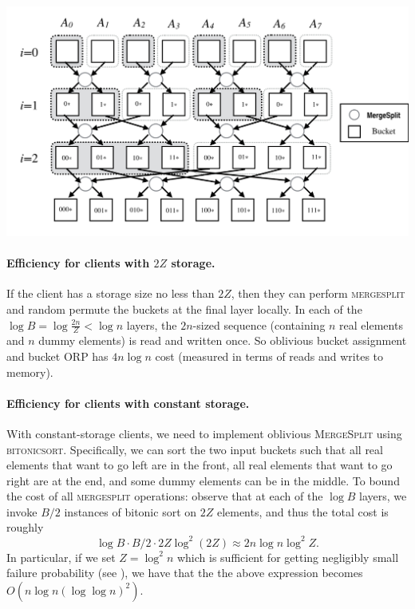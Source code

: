 \includegraphics[scale=0.45]{fig2.png}

\paragraph{Efficiency for clients with $2Z$ storage.}

If the client has a storage size no less than $2Z$, then they can perform \textsc{mergesplit} and random permute the buckets at the final layer locally. In each of the $\log B = \log \frac{2n}{Z} < \log n$ layers, the $2n$-sized sequence (containing $n$ real elements and $n$ dummy elements) is read  and written once. So oblivious bucket assignment and bucket ORP has $4n\log n$ cost (measured
in terms of reads and writes to memory). 

\paragraph{Efficiency for clients with constant storage.}
With constant-storage clients, we need to implement oblivious \textsc{MergeSplit} using \textsc{bitonicsort}. 
Specifically, we can sort the two input buckets such that all
real elements that want to go left  
are in the front, all real elements that want to go right are at the end,
and some dummy elements can be in the middle.
To bound the cost of all \textsc{mergesplit} operations:
observe that 
at each of the $\log B$ layers, we invoke $B/2$ 
instances of bitonic sort on $2Z$ elements,
and thus the total cost 
is roughly 
\[
\log B\cdot B/2\cdot 2Z\log^2(2Z)
\approx 2n\log n\log^2Z.\]
In particular, if we set $Z = \log^2 n$ which is sufficient
for getting negligibly small failure probability
(see ), we have that the  
the above expression becomes $O(n \log n (\log \log n)^2)$.



